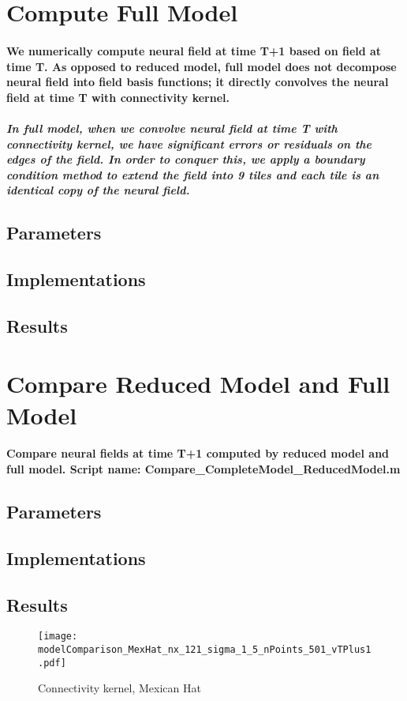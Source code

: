 \documentclass[a4paper, 12pt, english]{article}
\begin{document}
\section{Compute Full Model}
\paragraph{We numerically compute neural field at time T+1 based on field at time T.
As opposed to reduced model, full model does not decompose neural field into field basis functions; it directly convolves
the neural field at time T with connectivity kernel.}

\subparagraph{In full model, when we convolve neural field at time T with connectivity kernel,
we have significant errors or residuals on the edges of the field. In order to conquer this,
we apply a boundary condition method to extend the field into 9 tiles and each tile is an identical copy
of the neural field.}

\subsection{Parameters}
\subsection{Implementations}
\subsection{Results}
\newpage


\section{Compare Reduced Model and Full Model}
\paragraph{Compare neural fields at time T+1 computed by reduced model and full model.\newline
Script name: Compare\_CompleteModel\_ReducedModel.m}
\subsection{Parameters}
\subsection{Implementations}
\subsection{Results}


\begin{figure}[H]
\centering
\texttt{[image: modelComparison\_MexHat\_nx\_121\_sigma\_1\_5\_nPoints\_501\_vTPlus1.pdf]}
\caption{Connectivity kernel, Mexican Hat}
\end{figure}
\end{document}
